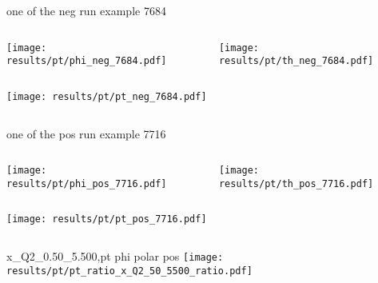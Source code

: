 \begin{frame}{one of the neg run example 7684}
\begin{columns}
\begin{column}[T]{0.5\textwidth}
\texttt{[image: results/pt/phi\_neg\_7684.pdf]}
\end{column}
\begin{column}[T]{0.5\textwidth}
\texttt{[image: results/pt/th\_neg\_7684.pdf]}
\end{column}
\end{columns}
\begin{columns}
\begin{column}[T]{0.5\textwidth}
\texttt{[image: results/pt/pt\_neg\_7684.pdf]}
\end{column}
\begin{column}[T]{0.5\textwidth}
\end{column}
\end{columns}
\end{frame}
\begin{frame}{one of the pos run example 7716}
\begin{columns}
\begin{column}[T]{0.5\textwidth}
\texttt{[image: results/pt/phi\_pos\_7716.pdf]}
\end{column}
\begin{column}[T]{0.5\textwidth}
\texttt{[image: results/pt/th\_pos\_7716.pdf]}
\end{column}
\end{columns}
\begin{columns}
\begin{column}[T]{0.5\textwidth}
\texttt{[image: results/pt/pt\_pos\_7716.pdf]}
\end{column}
\begin{column}[T]{0.5\textwidth}
\end{column}
\end{columns}
\end{frame}
\begin{frame}{x\_Q2\_0.50\_5.500,pt phi polar pos}
\texttt{[image: results/pt/pt\_ratio\_x\_Q2\_50\_5500\_ratio.pdf]}
\end{frame}
